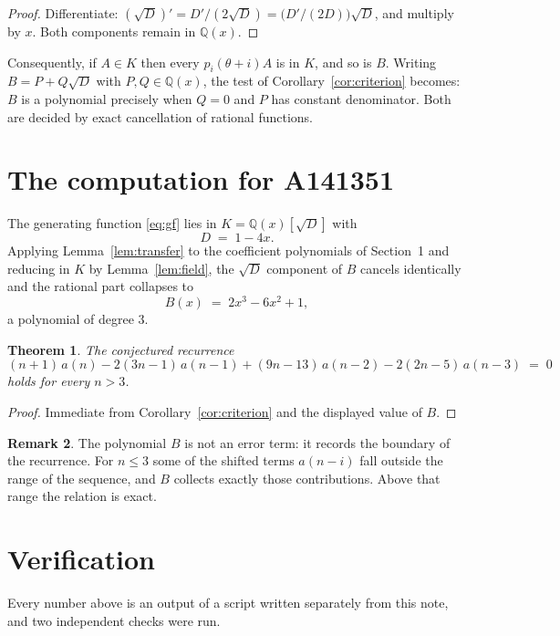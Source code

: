 \documentclass[11pt,a4paper]{article}
\theoremstyle{plain}
\newtheorem{theorem}{Theorem}
\theoremstyle{definition}
\newtheorem{remark}[theorem]{Remark}
\begin{document}
\begin{proof}
Differentiate: $(\sqrt{D})'=D'/(2\sqrt{D})=\bigl(D'/(2D)\bigr)\sqrt{D}$, and multiply by
$x$. Both components remain in $\mathbb{Q}(x)$.
\end{proof}

Consequently, if $A\in K$ then every $p_{i}(\theta+i)A$ is in $K$, and so is $B$. Writing
$B=P+Q\sqrt{D}$ with $P,Q\in\mathbb{Q}(x)$, the test of Corollary~\ref{cor:criterion}
becomes: $B$ is a polynomial precisely when $Q=0$ and $P$ has constant denominator. Both
are decided by exact cancellation of rational functions.

\section{The computation for A141351}

The generating function \eqref{eq:gf} lies in $K=\mathbb{Q}(x)[\sqrt{D}]$ with
\[
D \;=\; 1 - 4 x .
\]
Applying Lemma~\ref{lem:transfer} to the coefficient polynomials of Section~1 and reducing
in $K$ by Lemma~\ref{lem:field}, the $\sqrt{D}$ component of $B$ cancels identically and
the rational part collapses to
\[
B(x)\;=\;2 x^{3} - 6 x^{2} + 1 ,
\]
a polynomial of degree $3$.

\begin{theorem}
The conjectured recurrence
\[
(n + 1)\,a(n) -  2 \left(3 n - 1\right)\,a(n-1) + (9 n - 13)\,a(n-2) -  2 \left(2 n - 5\right)\,a(n-3) \;=\;0
\]
holds for every $n>3$.
\end{theorem}

\begin{proof}
Immediate from Corollary~\ref{cor:criterion} and the displayed value of $B$.
\end{proof}

\begin{remark}
The polynomial $B$ is not an error term: it records the boundary of the recurrence. For
$n\le3$ some of the shifted terms $a(n-i)$ fall outside the range of the sequence,
and $B$ collects exactly those contributions. Above that range the relation is exact.
\end{remark}

\section{Verification}

Every number above is an output of a script written separately from this note, and two
independent checks were run.
\end{document}
